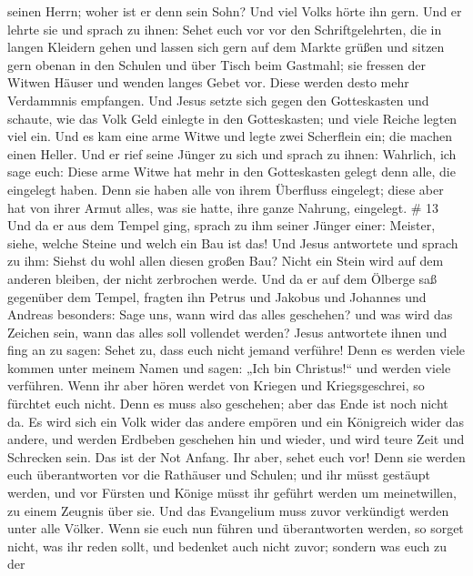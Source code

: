 seinen Herrn; woher ist er denn sein Sohn? Und viel Volks hörte ihn
gern.  Und er lehrte sie und sprach zu ihnen: Sehet euch
vor vor den Schriftgelehrten, die in langen Kleidern gehen und lassen
sich gern auf dem Markte grüßen  und sitzen gern obenan in
den Schulen und über Tisch beim Gastmahl;  sie fressen der
Witwen Häuser und wenden langes Gebet vor. Diese werden desto mehr
Verdammnis empfangen.  Und Jesus setzte sich gegen den
Gotteskasten und schaute, wie das Volk Geld einlegte in den
Gotteskasten; und viele Reiche legten viel ein.  Und es kam
eine arme Witwe und legte zwei Scherflein ein; die machen einen Heller.
 Und er rief seine Jünger zu sich und sprach zu ihnen:
Wahrlich, ich sage euch: Diese arme Witwe hat mehr in den Gotteskasten
gelegt denn alle, die eingelegt haben.  Denn sie haben alle
von ihrem Überfluss eingelegt; diese aber hat von ihrer Armut alles, was
sie hatte, ihre ganze Nahrung, eingelegt. \# 13  Und da er
aus dem Tempel ging, sprach zu ihm seiner Jünger einer: Meister, siehe,
welche Steine und welch ein Bau ist das!  Und Jesus
antwortete und sprach zu ihm: Siehst du wohl allen diesen großen Bau?
Nicht ein Stein wird auf dem anderen bleiben, der nicht zerbrochen
werde.  Und da er auf dem Ölberge saß gegenüber dem Tempel,
fragten ihn Petrus und Jakobus und Johannes und Andreas besonders:
 Sage uns, wann wird das alles geschehen? und was wird das
Zeichen sein, wann das alles soll vollendet werden?  Jesus
antwortete ihnen und fing an zu sagen: Sehet zu, dass euch nicht jemand
verführe!  Denn es werden viele kommen unter meinem Namen
und sagen: „Ich bin Christus!{}`` und werden viele verführen.
 Wenn ihr aber hören werdet von Kriegen und Kriegsgeschrei,
so fürchtet euch nicht. Denn es muss also geschehen; aber das Ende ist
noch nicht da.  Es wird sich ein Volk wider das andere
empören und ein Königreich wider das andere, und werden Erdbeben
geschehen hin und wieder, und wird teure Zeit und Schrecken sein. Das
ist der Not Anfang.  Ihr aber, sehet euch vor! Denn sie
werden euch überantworten vor die Rathäuser und Schulen; und ihr müsst
gestäupt werden, und vor Fürsten und Könige müsst ihr geführt werden um
meinetwillen, zu einem Zeugnis über sie.  Und das
Evangelium muss zuvor verkündigt werden unter alle Völker. 
Wenn sie euch nun führen und überantworten werden, so sorget nicht, was
ihr reden sollt, und bedenket auch nicht zuvor; sondern was euch zu der
